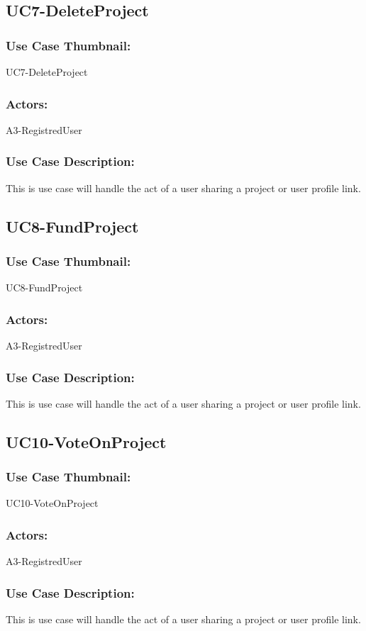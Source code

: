 \documentclass[11pt, openany]{report}
\begin{document}
\subsection{UC7-DeleteProject}
\label{sUC7}
\subsubsection*{Use Case Thumbnail:}
UC7-DeleteProject
\subsubsection*{Actors:}
A3-RegistredUser
\subsubsection*{Use Case Description:}
This is use case will handle the act of a user sharing a project or user profile link.

\subsection{UC8-FundProject}
\label{sUC8}
\subsubsection*{Use Case Thumbnail:}
UC8-FundProject
\subsubsection*{Actors:}
A3-RegistredUser
\subsubsection*{Use Case Description:}
This is use case will handle the act of a user sharing a project or user profile link.

\subsection{UC10-VoteOnProject}
\label{sUC10}
\subsubsection*{Use Case Thumbnail:}
UC10-VoteOnProject
\subsubsection*{Actors:}
A3-RegistredUser
\subsubsection*{Use Case Description:}
This is use case will handle the act of a user sharing a project or user profile link.
\end{document}
